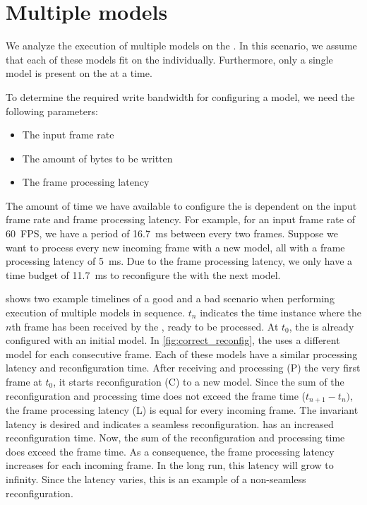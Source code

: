 \section{Multiple models}
We analyze the execution of multiple models on the \graicore{}.
In this scenario, we assume that each of these models fit on the \graicore{} individually.
Furthermore, only a single model is present on the \graicore{} at a time.

To determine the required write bandwidth for configuring a model, we need the following parameters:
\begin{itemize}
    \item The input frame rate
    \item The amount of bytes to be written
    \item The frame processing latency
\end{itemize}

The amount of time we have available to configure the \graicore{} is dependent on the input frame rate and frame processing latency.
For example, for an input frame rate of \SI{60}{FPS}, we have a period of \SI{16.7}{ms} between every two frames.
Suppose we want to process every new incoming frame with a new model, all with a frame processing latency of \SI{5}{ms}. 
Due to the frame processing latency, we only have a time budget of \SI{11.7}{ms} to reconfigure the \graicore{} with the next model.

 shows two example timelines of a good and a bad scenario when performing execution of multiple models in sequence.
$t_n$ indicates the time instance where the $n$th frame has been received by the \graicore{}, ready to be processed.
At $t_0$, the \graicore{} is already configured with an initial model.
In \cref{fig:correct_reconfig}, the \graicore{} uses a different model for each consecutive frame.
Each of these models have a similar processing latency and reconfiguration time.
After receiving and processing (P) the very first frame at $t_0$, it starts reconfiguration (C) to a new model.
Since the sum of the reconfiguration and processing time does not exceed the frame time ($t_{n+1} - t_{n})$, the frame processing latency (L) is equal for every incoming frame.
The invariant latency is desired and indicates a seamless reconfiguration.
 has an increased reconfiguration time.
Now, the sum of the reconfiguration and processing time does exceed the frame time.
As a consequence, the frame processing latency increases for each incoming frame.
In the long run, this latency will grow to infinity.
Since the latency varies, this is an example of a non-seamless reconfiguration.

